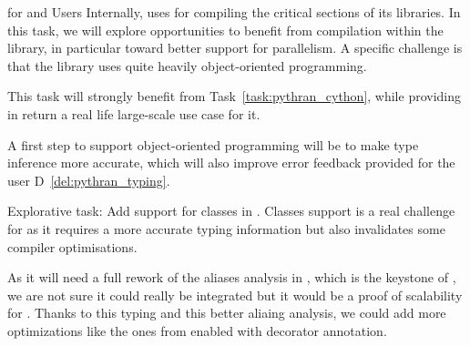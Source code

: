 \begin{Workpackage}{\thewpno}
\begin{task}{\Pythran for \Sage and \Sage Users}
  Internally, \Sage uses \Cython for compiling the critical sections of
  its libraries. In this task, we will explore opportunities to
  benefit from \Pythran compilation within the \Sage library, in
  particular toward better support for parallelism. A specific
  challenge is that the \Sage library uses quite heavily
  object-oriented programming.

  This task will strongly benefit from Task~\ref{task:pythran_cython},
  while providing in return a real life large-scale use case for it.

  A first step to support object-oriented programming will be to make
  \Pythran type inference more accurate, which will also improve error
  feedback provided for the user D~\ref{del:pythran_typing}.
\end{task}

\begin{task}{Explorative task: Add support for classes in \Pythran.}
  Classes support is a real challenge for \Pythran as it requires a more
  accurate typing information but also invalidates some compiler optimisations.

  As it will need a full rework of the aliases analysis in \Pythran, which is
  the keystone of \Pythran, we are not sure it could really
  be integrated but it would be a proof of scalability for \Pythran.
  Thanks to this typing and this better aliaing analysis, we could add more
  optimizations like the ones from \Cython enabled with decorator annotation.
\end{task}

\begin{WPDeliverables}
\end{WPDeliverables}
\end{Workpackage}
